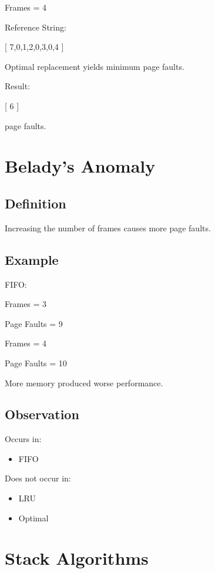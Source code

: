 Frames = 4

Reference String:

[
7,0,1,2,0,3,0,4
]

Optimal replacement yields minimum page faults.

Result:

[
6
]

page faults.

\section{Belady's Anomaly}

\subsection{Definition}

Increasing the number of frames causes more page faults.

\subsection{Example}

FIFO:

Frames = 3

Page Faults = 9

Frames = 4

Page Faults = 10

More memory produced worse performance.

\subsection{Observation}

Occurs in:

\begin{itemize}
\item FIFO
\end{itemize}

Does not occur in:

\begin{itemize}
\item LRU
\item Optimal
\end{itemize}

\section{Stack Algorithms}

